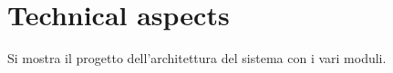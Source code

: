\chapter{Technical aspects}
\label{capitolo5}
\thispagestyle{empty}



\noindent Si mostra il progetto dell'architettura del sistema con i vari moduli.
